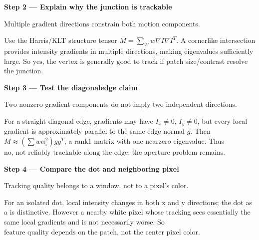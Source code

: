 \documentclass[letterpaper,11pt,english,openany,oneside]{jupyterBook}
\begin{document}
\par

\par\medskip{}
{\color{QuizStepRed}\bfseries Step 2 — Explain why the junction is trackable}\par\smallskip

\sphinxAtStartPar
{} Multiple gradient directions constrain both motion components.

\sphinxAtStartPar
Use the Harris/KLT structure tensor {\color{QuizMathBlue} \(M=\sum_W w\nabla I\nabla I^T\)}. A corner\sphinxhyphen{}like intersection provides intensity gradients in multiple directions, making  eigenvalues sufficiently large. So {\color{QuizMathBlue} \(\boxed{\text{yes, the vertex is generally good to track}}\)} if patch size/contrast resolve the junction.

\par

\par\medskip{}
{\color{QuizStepRed}\bfseries Step 3 — Test the diagonal\sphinxhyphen{}edge claim}\par\smallskip

\sphinxAtStartPar
{} Two nonzero gradient components do not imply two independent directions.

\sphinxAtStartPar
For a straight diagonal edge, gradients may have  {\color{QuizMathBlue} \(I_x\ne0\)}, {\color{QuizMathBlue} \(I_y\ne0\)}, but every local gradient is approximately parallel to the same edge normal {\color{QuizMathBlue} \(g\)}. Then {\color{QuizMathBlue} \(M\approx(\sum w\alpha_i^2)gg^T\)}, a rank\sphinxhyphen{}1 matrix with one near\sphinxhyphen{}zero eigenvalue. Thus {\color{QuizMathBlue} \(\boxed{\text{no, not reliably trackable along the edge}}\)}: the aperture problem remains.

\par

\par\medskip{}
{\color{QuizStepRed}\bfseries Step 4 — Compare the dot and neighboring pixel}\par\smallskip

\sphinxAtStartPar
{} Tracking quality belongs to a window, not to a pixel’s color.

\sphinxAtStartPar
For an isolated dot, local intensity changes in both x and y directions; the dot as a  is distinctive. However a nearby white pixel whose tracking  sees essentially the same local gradients and is not necessarily worse. So {\color{QuizMathBlue} \(\boxed{\text{feature quality depends on the patch, not the center pixel color}}\)}.
\end{document}
